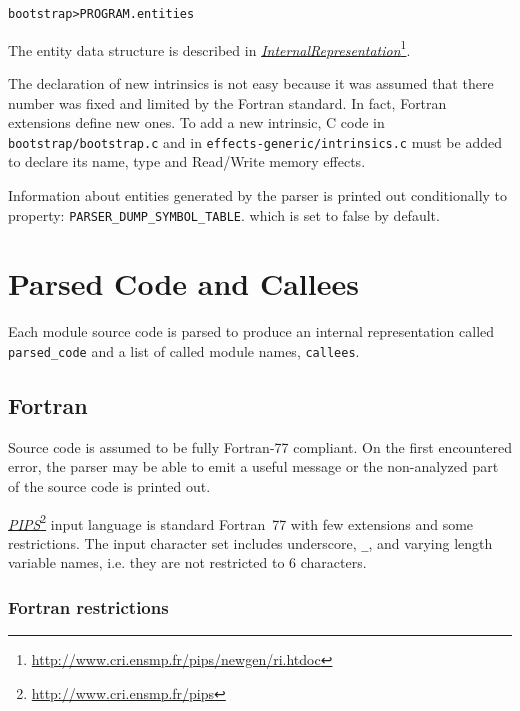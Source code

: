 \documentclass[a4paper]{report}
\newenvironment{PipsMake}{\begin{alltt}}{\end{alltt}}
\newcommand{\LINK}[2]{\href{#2}{#1}\footnote{\url{#2}}\xspace}
\newcommand{\PIPS}{\LINK{\emph{PIPS}}{http://www.cri.ensmp.fr/pips}}
\newcommand{\Pri}{\LINK{\emph{Internal\space{}Representation}}{http://www.cri.ensmp.fr/pips/newgen/ri.htdoc}}
\begin{document}
\begin{PipsMake}
bootstrap                       > PROGRAM.entities
\end{PipsMake}

The entity data structure is described in \Pri{}.

The declaration of new intrinsics is not easy because it was assumed that
there number was fixed and limited by the Fortran standard. In fact,
Fortran extensions define new ones. To add a new intrinsic, C code in
\texttt{bootstrap/bootstrap.c} and in \texttt{effects-generic/intrinsics.c}
must be added to declare its name, type and Read/Write memory effects.

Information about entities generated by the parser is printed out
conditionally to property: \texttt{PARSER\_DUMP\_SYMBOL\_TABLE}.
which is set to false by default.

\section{Parsed Code and Callees}
\label{subsection-parsed-code-and-callees}

Each module source code is parsed to produce an internal representation
called \verb+parsed_code+ and a list of called module names,
\verb+callees+.


\subsection{Fortran}
\label{sec:fortran}


Source code is assumed to be fully Fortran-77
compliant. On the first encountered error, the parser may be able to
emit a useful message or the non-analyzed part of the source code is
printed out.

\PIPS{} input language is standard Fortran~77 with few extensions and some
restrictions. The input character set includes underscore, \verb/_/, and
varying length variable names, i.e. they are not restricted to 6
characters.

\subsubsection{Fortran restrictions}
\end{document}
